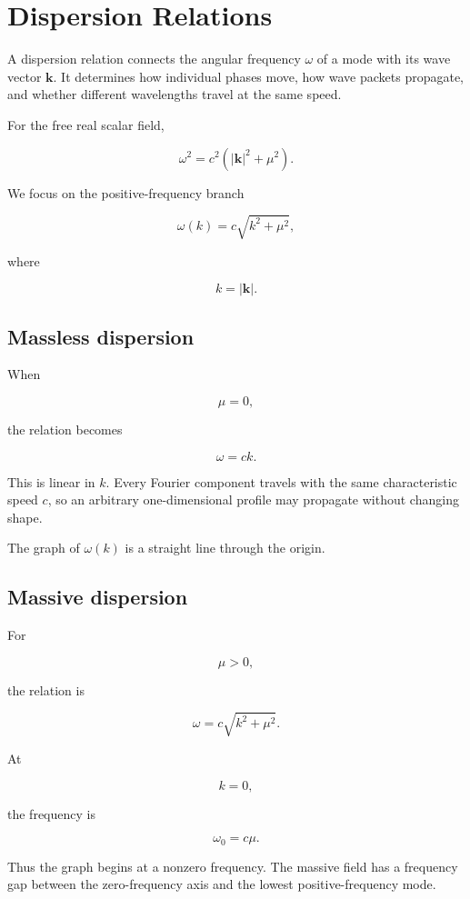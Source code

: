 \section{Dispersion Relations}
\label{sec:dispersion_relations}

A dispersion relation connects the angular frequency \(\omega\) of a mode with its wave vector \(\mathbf{k}\). It determines how individual phases move, how wave packets propagate, and whether different wavelengths travel at the same speed.

For the free real scalar field,

\[
\boxed{
\omega^{2}
=
c^{2}
\left(
|\mathbf{k}|^{2}+\mu^{2}
\right)
}.
\]

We focus on the positive-frequency branch

\[
\boxed{
\omega(k)
=
c\sqrt{k^{2}+\mu^{2}}
},
\]

where

\[
k=|\mathbf{k}|.
\]

\subsection{Massless dispersion}

When

\[
\mu=0,
\]

the relation becomes

\[
\boxed{
\omega=ck
}.
\]

This is linear in \(k\). Every Fourier component travels with the same characteristic speed \(c\), so an arbitrary one-dimensional profile may propagate without changing shape.

The graph of \(\omega(k)\) is a straight line through the origin.

\subsection{Massive dispersion}

For

\[
\mu>0,
\]

the relation is

\[
\boxed{
\omega=c\sqrt{k^{2}+\mu^{2}}
}.
\]

At

\[
k=0,
\]

the frequency is

\[
\boxed{
\omega_{0}=c\mu
}.
\]

Thus the graph begins at a nonzero frequency. The massive field has a frequency gap between the zero-frequency axis and the lowest positive-frequency mode.


